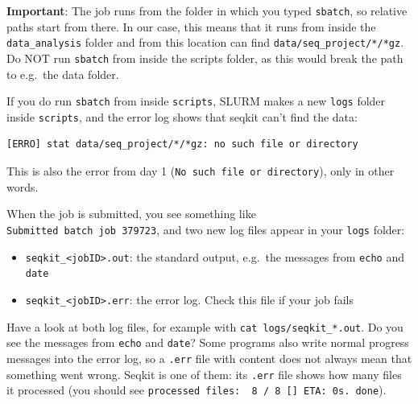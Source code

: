 \documentclass[
  letterpaper,
  DIV=11,
  numbers=noendperiod]{scrreprt}
\newenvironment{Shaded}{}{}
\newcommand{\AttributeTok}[1]{\textcolor[rgb]{0.84,0.23,0.29}{#1}}
\newcommand{\CommentTok}[1]{\textcolor[rgb]{0.42,0.45,0.49}{#1}}
\newcommand{\ExtensionTok}[1]{\textcolor[rgb]{0.84,0.23,0.29}{\textbf{#1}}}
\newcommand{\FunctionTok}[1]{\textcolor[rgb]{0.44,0.26,0.76}{#1}}
\newcommand{\NormalTok}[1]{\textcolor[rgb]{0.14,0.16,0.18}{#1}}
\newcommand{\VariableTok}[1]{\textcolor[rgb]{0.89,0.38,0.04}{#1}}
\providecommand{\tightlist}{%
  \setlength{\itemsep}{0pt}\setlength{\parskip}{0pt}}
\begin{document}
\begin{Shaded}
\end{Shaded}

\textbf{Important}: The job runs from the folder in which you typed
\texttt{sbatch}, so relative paths start from there. In our case, this
means that it runs from inside the \texttt{data\_analysis} folder and
from this location can find \texttt{data/seq\_project/*/*gz}. Do NOT run
\texttt{sbatch} from inside the scripts folder, as this would break the
path to e.g.~the data folder.

If you do run \texttt{sbatch} from inside \texttt{scripts}, SLURM makes
a new \texttt{logs} folder inside \texttt{scripts}, and the error log
shows that seqkit can't find the data:

\begin{verbatim}
[ERRO] stat data/seq_project/*/*gz: no such file or directory
\end{verbatim}

This is also the error from day 1
(\texttt{No\ such\ file\ or\ directory}), only in other words.

When the job is submitted, you see something like
\texttt{Submitted\ batch\ job\ 379723}, and two new log files appear in
your \texttt{logs} folder:

\begin{itemize}
\tightlist
\item
  \texttt{seqkit\_\textless{}jobID\textgreater{}.out}: the standard
  output, e.g.~the messages from \texttt{echo} and \texttt{date}
\item
  \texttt{seqkit\_\textless{}jobID\textgreater{}.err}: the error log.
  Check this file if your job fails
\end{itemize}

Have a look at both log files, for example with
\texttt{cat\ logs/seqkit\_*.out}. Do you see the messages from
\texttt{echo} and \texttt{date}? Some programs also write normal
progress messages into the error log, so a \texttt{.err} file with
content does not always mean that something went wrong. Seqkit is one of
them: its \texttt{.err} file shows how many files it processed (you
should see
\texttt{processed\ files:\ \ 8\ /\ 8\ {[}{]}\ ETA:\ 0s.\ done}).
\end{document}
